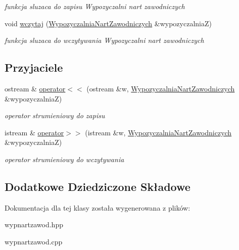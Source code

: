 \begin{DoxyCompactItemize}
\begin{DoxyCompactList}\small\item\em funkcja sluzaca do zapisu Wypozyczalni nart zawodniczych \end{DoxyCompactList}\item 
\mbox{\label{class_wypozyczalnia_nart_zawodniczych_a1a7c5b253967d7c214b68f0e27273c91}} 
void \hyperlink{class_wypozyczalnia_nart_zawodniczych_a1a7c5b253967d7c214b68f0e27273c91}{wczytaj} (\hyperlink{class_wypozyczalnia_nart_zawodniczych}{Wypozyczalnia\+Nart\+Zawodniczych} \&wypozyczalniaZ)
\begin{DoxyCompactList}\small\item\em funkcja sluzaca do wczytywania Wypozyczalni nart zawodniczych \end{DoxyCompactList}\end{DoxyCompactItemize}
\subsection*{Przyjaciele}
\begin{DoxyCompactItemize}
\item 
\mbox{\label{class_wypozyczalnia_nart_zawodniczych_ab8dabbf7f792bd7e412f063fee53d7ce}} 
ostream \& \hyperlink{class_wypozyczalnia_nart_zawodniczych_ab8dabbf7f792bd7e412f063fee53d7ce}{operator$<$$<$} (ostream \&w, \hyperlink{class_wypozyczalnia_nart_zawodniczych}{Wypozyczalnia\+Nart\+Zawodniczych} \&wypozyczalniaZ)
\begin{DoxyCompactList}\small\item\em operator strumieniowy do zapisu \end{DoxyCompactList}\item 
\mbox{\label{class_wypozyczalnia_nart_zawodniczych_a12481b91994af65722e631c2470457e1}} 
istream \& \hyperlink{class_wypozyczalnia_nart_zawodniczych_a12481b91994af65722e631c2470457e1}{operator$>$$>$} (istream \&w, \hyperlink{class_wypozyczalnia_nart_zawodniczych}{Wypozyczalnia\+Nart\+Zawodniczych} \&wypozyczalniaZ)
\begin{DoxyCompactList}\small\item\em operator strumieniowy do wczytywania \end{DoxyCompactList}\end{DoxyCompactItemize}
\subsection*{Dodatkowe Dziedziczone Składowe}


Dokumentacja dla tej klasy została wygenerowana z plików\+:\begin{DoxyCompactItemize}
\item 
wypnartzawod.\+hpp\item 
wypnartzawod.\+cpp\end{DoxyCompactItemize}
